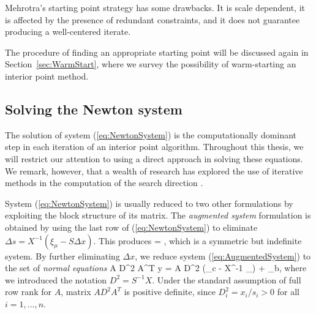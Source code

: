 Mehrotra's starting point strategy has some drawbacks. It is scale dependent,
it is affected by the presence of redundant constraints,
and it does not guarantee producing a well-centered iterate.

The procedure of finding an appropriate starting point will be discussed
again in Section~\ref{sec:WarmStart}, where we survey the possibility
of warm-starting an interior point method.


%
%
\subsection{Solving the Newton system}
\label{sec:SolvingNewtonSystem}

The solution of system (\ref{eq:NewtonSystem}) is the computationally
dominant step in each iteration of an interior point algorithm.
Throughout this thesis, we will 
restrict our attention to using a direct approach in solving these
equations.
We remark, however, that a wealth of research has explored the use
of iterative methods in the computation of the search direction
\cite{BergamaschiGondzioZilli,OliveiraSorensen05}.

System (\ref{eq:NewtonSystem}) is usually reduced to two other
formulations by exploiting the block structure of its
matrix.
%
The {\em augmented system} formulation is obtained by using 
the last row of (\ref{eq:NewtonSystem}) to eliminate
$\Delta s = X^{-1} (\xi_\mu - S\Delta x)$.
This produces
%
\be \label{eq:AugmentedSystem}
\left[ \begin{array}{cc}
    -X^{-1}S & A^T \\ A & 0
  \end{array} \right]
 =
\left[ \begin{array}{c}
    \xi_c - X^{-1}\xi_\mu \\ \xi_b
   \end{array} \right],
\ee
which is a symmetric but indefinite system.
%
By further eliminating $\Delta x$, we reduce system 
(\ref{eq:AugmentedSystem}) to the set of {\em normal equations}
%
\be \label{eq:NormalEquations}
  A D^2 A^T \Delta y = A D^2 (\xi_c - X^{-1} \xi_\mu) + \xi_b,
\ee
%
where we introduced the notation $D^2 = S^{-1} X$.
Under the standard assumption of full row rank for $A$, matrix 
$A D^2 A^T$ is positive definite, since $D^2_i = x_i/s_i > 0$ for
all $i = 1, \ldots, n$.

